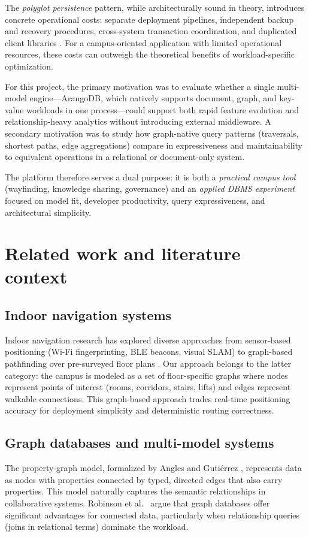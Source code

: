 \documentclass[13pt,a4paper]{report}
\begin{document}
The \emph{polyglot persistence} pattern, while architecturally sound in theory, introduces concrete operational costs: separate deployment pipelines, independent backup and recovery procedures, cross-system transaction coordination, and duplicated client libraries \cite{sadalage2012nosql}. For a campus-oriented application with limited operational resources, these costs can outweigh the theoretical benefits of workload-specific optimization.

For this project, the primary motivation was to evaluate whether a single multi-model engine---ArangoDB, which natively supports document, graph, and key-value workloads in one process---could support both rapid feature evolution and relationship-heavy analytics without introducing external middleware. A secondary motivation was to study how graph-native query patterns (traversals, shortest paths, edge aggregations) compare in expressiveness and maintainability to equivalent operations in a relational or document-only system.

The platform therefore serves a dual purpose: it is both a \emph{practical campus tool} (wayfinding, knowledge sharing, governance) and an \emph{applied DBMS experiment} focused on model fit, developer productivity, query expressiveness, and architectural simplicity.

\section{Related work and literature context}
\subsection{Indoor navigation systems}
Indoor navigation research has explored diverse approaches from sensor-based positioning (Wi-Fi fingerprinting, BLE beacons, visual SLAM) to graph-based pathfinding over pre-surveyed floor plans \cite{zimmerman2006wayfinding}. Our approach belongs to the latter category: the campus is modeled as a set of floor-specific graphs where nodes represent points of interest (rooms, corridors, stairs, lifts) and edges represent walkable connections. This graph-based approach trades real-time positioning accuracy for deployment simplicity and deterministic routing correctness.

\subsection{Graph databases and multi-model systems}
The property-graph model, formalized by Angles and Guti\'{e}rrez \cite{angles2008property}, represents data as nodes with properties connected by typed, directed edges that also carry properties. This model naturally captures the semantic relationships in collaborative systems. Robinson et al.\ \cite{robinson2015graph} argue that graph databases offer significant advantages for connected data, particularly when relationship queries (joins in relational terms) dominate the workload.
\end{document}
